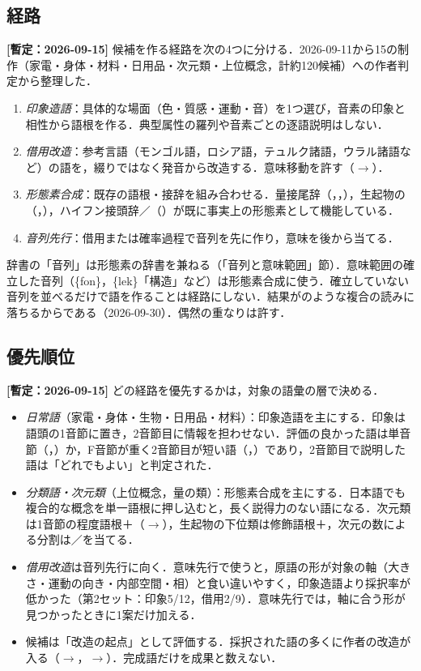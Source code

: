 \documentclass[../../main-detail.tex]{subfiles}
\begin{document}
\subsection{経路}
\textbf{[暫定：2026-09-15]} 候補を作る経路を次の4つに分ける．2026-09-11から15の制作（家電・身体・材料・日用品・次元類・上位概念，計約120候補）への作者判定から整理した．
\begin{enumerate}
    \item \emph{印象造語}：具体的な場面（色・質感・運動・音）を1つ選び，音素の印象と相性から語根を作る．典型属性の羅列や音素ごとの逐語説明はしない．
    \item \emph{借用改造}：参考言語（モンゴル語，ロシア語，テュルク諸語，ウラル諸語など）の語を，綴りではなく発音から改造する．意味移動を許す（$\to$）．
    \item \emph{形態素合成}：既存の語根・接辞を組み合わせる．量接尾辞（，，），生起物の（，），ハイフン接頭辞／（）が既に事実上の形態素として機能している．
    \item \emph{音列先行}：借用または確率過程で音列を先に作り，意味を後から当てる．
\end{enumerate}
辞書の「音列」は形態素の辞書を兼ねる（「音列と意味範囲」節）．意味範囲の確立した音列（\{fon\}，\{lek\}「構造」など）は形態素合成に使う．確立していない音列を並べるだけで語を作ることは経路にしない．結果がのような複合の読みに落ちるからである（2026-09-30）．偶然の重なりは許す．

\subsection{優先順位}
\textbf{[暫定：2026-09-15]} どの経路を優先するかは，対象の語彙の層で決める．
\begin{itemize}
    \item \emph{日常語}（家電・身体・生物・日用品・材料）：印象造語を主にする．印象は語頭の1音節に置き，2音節目に情報を担わせない．評価の良かった語は単音節（，）か，F音節が重く2音節目が短い語（，）であり，2音節目で説明した語は「どれでもよい」と判定された．
    \item \emph{分類語・次元類}（上位概念，量の類）：形態素合成を主にする．日本語でも複合的な概念を単一語根に押し込むと，長く説得力のない語になる．次元類は1音節の程度語根＋（$\to$），生起物の下位類は修飾語根＋，次元の数による分割は／を当てる．
    \item \emph{借用改造}は音列先行に向く．意味先行で使うと，原語の形が対象の軸（大きさ・運動の向き・内部空間・相）と食い違いやすく，印象造語より採択率が低かった（第2セット：印象5/12，借用2/9）．意味先行では，軸に合う形が見つかったときに1案だけ加える．
    \item 候補は「改造の起点」として評価する．採択された語の多くに作者の改造が入る（$\to$，$\to$）．完成語だけを成果と数えない．
\end{itemize}
\end{document}
